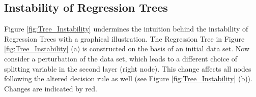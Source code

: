 \subsection{Instability of Regression Trees}
\label{sec:instability}



\noindent
Figure \ref{fig:Tree_Instability} undermines the intuition behind the instability of Regression Trees with a graphical illustration. The Regression Tree in Figure \ref{fig:Tree_Instability} (a) is constructed on the basis of an initial data set. Now consider a perturbation of the data set, which leads to a different choice of splitting variable in the second layer (right node). This change affects all nodes following the altered decision rule as well (see Figure \ref{fig:Tree_Instability} (b)). Changes are indicated by red.
